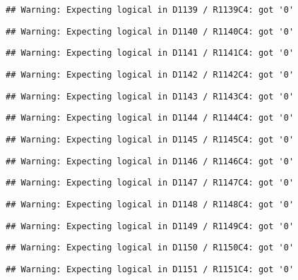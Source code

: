 \documentclass[
]{article}
\begin{document}
\begin{verbatim}
## Warning: Expecting logical in D1139 / R1139C4: got '0'
\end{verbatim}

\begin{verbatim}
## Warning: Expecting logical in D1140 / R1140C4: got '0'
\end{verbatim}

\begin{verbatim}
## Warning: Expecting logical in D1141 / R1141C4: got '0'
\end{verbatim}

\begin{verbatim}
## Warning: Expecting logical in D1142 / R1142C4: got '0'
\end{verbatim}

\begin{verbatim}
## Warning: Expecting logical in D1143 / R1143C4: got '0'
\end{verbatim}

\begin{verbatim}
## Warning: Expecting logical in D1144 / R1144C4: got '0'
\end{verbatim}

\begin{verbatim}
## Warning: Expecting logical in D1145 / R1145C4: got '0'
\end{verbatim}

\begin{verbatim}
## Warning: Expecting logical in D1146 / R1146C4: got '0'
\end{verbatim}

\begin{verbatim}
## Warning: Expecting logical in D1147 / R1147C4: got '0'
\end{verbatim}

\begin{verbatim}
## Warning: Expecting logical in D1148 / R1148C4: got '0'
\end{verbatim}

\begin{verbatim}
## Warning: Expecting logical in D1149 / R1149C4: got '0'
\end{verbatim}

\begin{verbatim}
## Warning: Expecting logical in D1150 / R1150C4: got '0'
\end{verbatim}

\begin{verbatim}
## Warning: Expecting logical in D1151 / R1151C4: got '0'
\end{verbatim}
\end{document}
